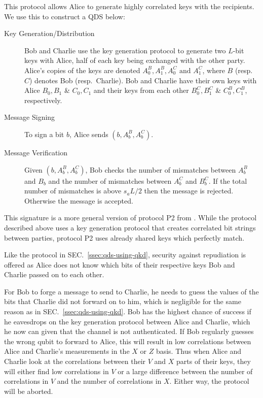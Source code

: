\documentclass[%
 reprint,
 amsmath,amssymb,
 aps,
 pra,
]{revtex4-1}
\begin{document}
This protocol allows Alice to generate highly correlated keys with the recipients. We use this to construct a QDS below:

\begin{description}
\item[Key Generation/Distribution]Bob and Charlie use the key generation protocol to generate two $L$-bit keys with Alice, half of each key being exchanged with the other party. Alice's copies of the keys are denoted $A^B_0, A^B_1, A^C_0 \text{ and } A^C_1$, where $B$ (resp.\ $C$) denotes Bob (resp.\ Charlie). Bob and Charlie have their own keys with Alice $B_0, B_1$ \& $C_0, C_1$ and their keys from each other $B^C_0, B^C_1$ \& $C^B_0, C^B_1$, respectively.
\item[Message Signing]To sign a bit $b$, Alice sends $(b, A^B_b, A^C_b)$.
\item[Message Verification]Given $(b, A^B_b, A^C_b)$, Bob checks the number of mismatches between $A^B_b$ and $B_b$ and the number of mismatches between $A^C_b$ and $B^C_b$. If the total number of mismatches is above $s_aL/2$ then the message is rejected. Otherwise the message is accepted.
\end{description}

This signature is a more general version of protocol P2 from \cite{PhysRevA.91.042304}. While the protocol described above uses a key generation protocol that creates correlated bit strings between parties, protocol P2 uses already shared keys which perfectly match.

Like the protocol in SEC.\ \ref{ssec:qds-using-qkd}, security against repudiation is offered as Alice does not know which bits of their respective keys Bob and Charlie passed on to each other.

For Bob to forge a message to send to Charlie, he needs to guess the values of the bits that Charlie did not forward on to him, which is negligible for the same reason as in SEC.\ \ref{ssec:qds-using-qkd}. Bob has the highest chance of success if he eavesdrops on the key generation protocol between Alice and Charlie, which he now can given that the channel is not authenticated. If Bob regularly guesses the wrong qubit to forward to Alice, this will result in low correlations between Alice and Charlie's measurements in the $X$ or $Z$ basis. Thus when Alice and Charlie look at the correlations between their $V$ and $X$ parts of their keys, they will either find low correlations in $V$ or a large difference between the number of correlations in $V$ and the number of correlations in $X$. Either way, the protocol will be aborted.
\end{document}
